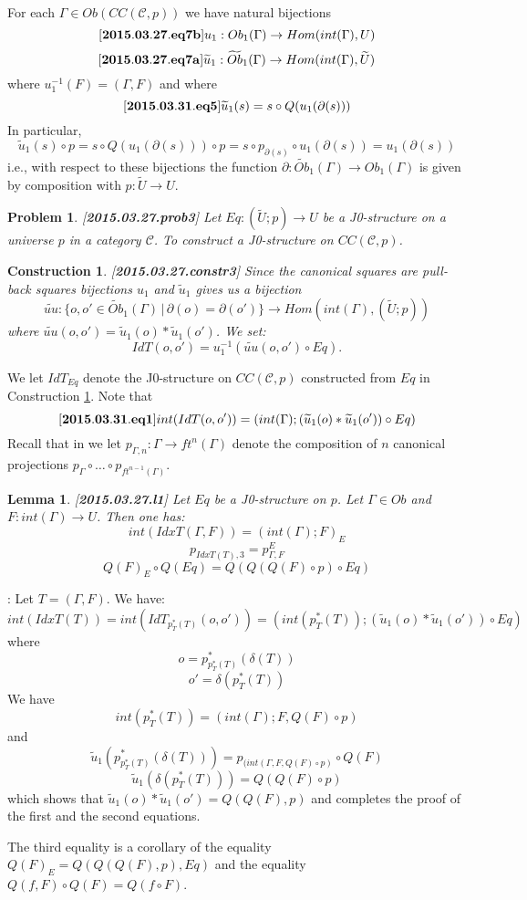 \documentclass[12pt]{article}
\newenvironment{eq}{\begin{equation}}{\end{equation}}
\newenvironment{myproof}{{\bf Proof}:}{\vskip 5mm }
\newtheorem{lemma}[proposition]{Lemma}
\newtheorem{problem}[proposition]{Problem}
\newtheorem{construction}[proposition]{Construction}
\newcommand{\llabel}[1]{\label{#1}[{\bf #1}]}
\newcommand{\sr}{\rightarrow}
\newcommand{\wt}{\widetilde}
\begin{document}
For each $\Gamma\in Ob(CC({\mathcal C},p))$ we have natural bijections 
%
\begin{eq}
\llabel{2015.03.27.eq7b}
u_1:Ob_1(\Gamma)\sr Hom(int(\Gamma),U)
\end{eq}
%
\begin{eq}
\llabel{2015.03.27.eq7a}
\wt{u}_1:\wt{Ob}_1(\Gamma)\sr Hom(int(\Gamma),\wt{U})
\end{eq}
%
where $u_1^{-1}(F)=(\Gamma,F)$ and where
%
\begin{eq}
\llabel{2015.03.31.eq5}
\wt{u}_1(s)=s\circ Q(u_1(\partial(s)))
\end{eq}
%
In particular,
%
$$\wt{u}_1(s)\circ p=s\circ Q(u_1(\partial(s)))\circ p=s\circ p_{\partial(s)}\circ u_1(\partial(s))=u_1(\partial(s))$$
%
i.e., with respect to these bijections the function $\partial:\wt{Ob}_1(\Gamma)\sr Ob_1(\Gamma)$ is given by composition with $p:\wt{U}\sr U$. 
%
\begin{problem}
\llabel{2015.03.27.prob3}
Let $Eq:(\wt{U};p)\sr U$ be a J0-structure on a universe $p$ in a category $\mathcal C$. To construct a J0-structure on $CC({\mathcal C},p)$.
\end{problem}
%
\begin{construction}\rm
\llabel{2015.03.27.constr3}
Since the canonical squares are pull-back squares bijections $u_1$ and $\wt{u}_1$ gives us a bijection
%
$$\wt{uu}:\{o,o'\in\wt{Ob}_1(\Gamma)\,|\,\partial(o)=\partial(o')\} \sr Hom(int(\Gamma),(\wt{U};p))$$
%
where $\wt{uu}(o,o')=\wt{u}_1(o)*\wt{u}_1(o')$. We set:
%
$$IdT(o,o')=u_1^{-1}(\wt{uu}(o,o')\circ Eq).$$
%
\end{construction}
%
We let $IdT_{Eq}$ denote the J0-structure on $CC({\mathcal C},p)$ constructed from $Eq$ in Construction \ref{2015.03.27.constr3}. Note that
%
\begin{eq}
\llabel{2015.03.31.eq1}
int(IdT(o,o'))=(int(\Gamma);(\wt{u}_1(o)*\wt{u}_1(o'))\circ Eq)
\end{eq}
%
Recall that in \cite{Csubsystems} we let $p_{\Gamma,n}:\Gamma\sr ft^n(\Gamma)$ denote the composition of $n$ canonical projections $p_{\Gamma}\circ \dots\circ p_{ft^{n-1}(\Gamma)}$. 
%
\begin{lemma}
\llabel{2015.03.27.l1}
Let $Eq$ be a J0-structure on $p$. Let $\Gamma\in Ob$ and $F:int(\Gamma)\sr U$. Then one has:
%
$$int(IdxT(\Gamma,F))=(int(\Gamma);F)_{E}$$
$$p_{IdxT(T),3} = p^E_{\Gamma,F}$$
$$Q(F)_{E}\circ Q(Eq)=Q(Q(Q(F)\circ p)\circ Eq)$$
%
%
\end{lemma}
%
\begin{myproof}
Let $T=(\Gamma,F)$. We have:
%
$$int(IdxT(T))=int(IdT_{p_T^*(T)}(o,o'))=(int(p_T^*(T));(\wt{u}_1(o)*\wt{u}_1(o'))\circ Eq)$$
%
where 
%
$$o=p_{p_T^*(T)}^*(\delta(T))$$
$$o'=\delta(p_T^*(T))$$
%
We have
%
$$int(p_T^*(T))=(int(\Gamma);F,Q(F)\circ p)$$
%
and
%
$$\wt{u}_1(p_{p_T^*(T)}^*(\delta(T)))=p_{(int(\Gamma,F, Q(F)\circ p)}\circ Q(F)$$
$$\wt{u}_1(\delta(p_T^*(T)))=Q(Q(F)\circ p)$$
%
which shows that $\wt{u}_1(o)*\wt{u}_1(o')=Q(Q(F),p)$ and completes the proof of the first and the second equations.

The third equality is a corollary of the equality $Q(F)_{E}=Q(Q(Q(F),p),Eq)$ and the equality $Q(f,F)\circ Q(F)=Q(f\circ F)$. 
\end{myproof}
\end{document}
